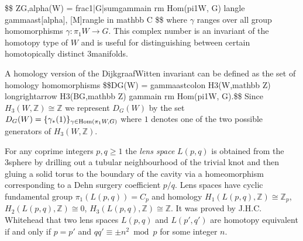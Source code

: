 \documentclass[a4paper,11pt]{report}
\begin{document}
{{\$\$
Z\texttt{}\texttt{}G,\texttt{}alpha\texttt{}(W)
=
\texttt{}frac\texttt{}1\texttt{}\texttt{}|G|\texttt{}\texttt{}sum{\textunderscore}\texttt{}\texttt{}gamma\texttt{}in
\texttt{}\texttt{}rm
Hom\texttt{}(\texttt{}pi{\textunderscore}1W,
G)\texttt{} \texttt{}langle
\texttt{}gamma\texttt{}\texttt{}ast[\texttt{}alpha],
[M]\texttt{}rangle \texttt{}
\texttt{}in\texttt{} \texttt{}mathbb
C\texttt{} \$\$ where $\gamma$ ranges over all group homomorphisms $\gamma\colon \pi_1W \rightarrow G$. This complex number is an invariant of the homotopy type of $W$ and is useful for distinguishing between certain homotopically distinct $3$\texttt{}manifolds. 

A homology version of the Dijkgraaf\texttt{}Witten invariant can be
defined as the set of homology homomorphisms \$\$D{\textunderscore}G(W)
=\texttt{}\texttt{}
\texttt{}gamma{\textunderscore}\texttt{}ast\texttt{}colon
H{\textunderscore}3(W,\texttt{}mathbb Z)
\texttt{}longrightarrow
H{\textunderscore}3(BG,\texttt{}mathbb Z)
\texttt{}\texttt{}{\textunderscore}\texttt{}\texttt{}gamma\texttt{}in
\texttt{}\texttt{}rm
Hom\texttt{}(\texttt{}pi{\textunderscore}1W,
G)\texttt{}.\$\$ Since $H_3(W,\mathbb Z)\cong \mathbb Z$ we represent $D_G(W)$ by the set $D_G(W)=\{ \gamma_\ast(1) \}_{\gamma\in {\rm Hom}(\pi_1W, G)}$ where $1$ denotes one of the two possible generators of $H_3(W,\mathbb Z)$. 

 For any coprime integers $p,q\ge 1$ the \emph{lens space} $L(p,q)$ is obtained from the 3\texttt{}sphere by drilling out a tubular
neighbourhood of the trivial knot and then gluing a solid torus to the
boundary of the cavity via a homeomorphism corresponding to a Dehn surgery
coefficient $p/q$. Lens spaces have cyclic fundamental group $\pi_1(L(p,q))=C_p$ and homology $H_1(L(p,q),\mathbb Z)\cong \mathbb Z_p$, $H_2(L(p,q),\mathbb Z)\cong 0$, $H_3(L(p,q),\mathbb Z)\cong \mathbb Z$. It was proved by J.H.C. Whitehead that two lens spaces $L(p,q)$ and $L(p',q')$ are homotopy equivalent if and only if $p=p'$ and $qq'\equiv \pm n^2 \bmod p$ for some integer $n$. 

}}
\end{document}
